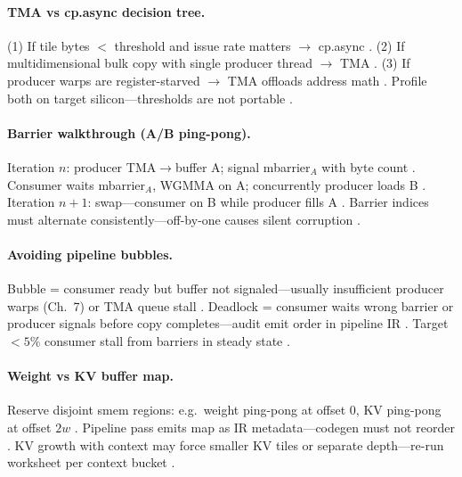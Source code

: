 \paragraph{TMA vs cp.async decision tree.}
(1) If tile bytes $\lt$ threshold and issue rate matters $\rightarrow$ cp.async \citep{dao2022flashattention,patel2025llminference}.
(2) If multidimensional bulk copy with single producer thread $\rightarrow$ TMA \citep{semianalysis2024tma,nvidia2022hopper}.
(3) If producer warps are register-starved $\rightarrow$ TMA offloads address math \citep{shah2024flashattention3,yirage2026}.
Profile both on target silicon---thresholds are not portable \citep{taxbreak2026,chen2020compilerbasedhardw}.

\paragraph{Barrier walkthrough (A/B ping-pong).}
Iteration $n$: producer TMA$\rightarrow$buffer A; signal mbarrier$_A$ with byte count \citep{semianalysis2024tma,shah2024flashattention3}.
Consumer waits mbarrier$_A$, WGMMA on A; concurrently producer loads B \citep{nvidia2022hopper,yirage2026}.
Iteration $n{+}1$: swap---consumer on B while producer fills A \citep{dao2022flashattention,semianalysis2024tma}.
Barrier indices must alternate consistently---off-by-one causes silent corruption \citep{patel2025llminference,taxbreak2026}.

\paragraph{Avoiding pipeline bubbles.}
Bubble = consumer ready but buffer not signaled---usually insufficient producer warps (Ch.~7) or TMA queue stall \citep{shah2024flashattention3,memoryfloor2026}.
Deadlock = consumer waits wrong barrier or producer signals before copy completes---audit emit order in pipeline IR \citep{yirage2026,semianalysis2024tma,nvidia2022hopper}.
Target ${\lt}5\%$ consumer stall from barriers in steady state \citep{patel2025llminference,shah2024flashattention3}.

\paragraph{Weight vs KV buffer map.}
Reserve disjoint smem regions: e.g.\ weight ping-pong at offset 0, KV ping-pong at offset $2w$ \citep{yirage2026,dao2022flashattention,kwon2023vllm}.
Pipeline pass emits map as IR metadata---codegen must not reorder \citep{chen2020compilerbasedhardw,wu2024mirage}.
KV growth with context may force smaller KV tiles or separate depth---re-run worksheet per context bucket \citep{dao2023flashdecoding,patel2025llminference}.

